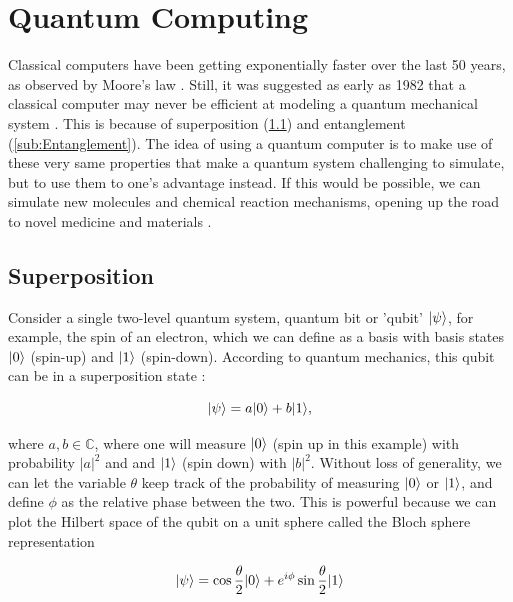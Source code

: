 \section{Quantum Computing}

Classical computers have been getting exponentially faster over the last 50 years, as observed by Moore's law \cite{Moore1965}. Still, it was suggested as early as 1982 that a classical computer may never be efficient at modeling a quantum mechanical system \cite{Feynman1982}. This is because of superposition (\cref{sub:Superposition}) and entanglement (\cref{sub:Entanglement}). The idea of using a quantum computer is to make use of these very same properties that make a quantum system challenging to simulate, but to use them to one's advantage instead. If this would be possible, we can simulate new molecules and chemical reaction mechanisms, opening up the road to novel medicine \cite{Robert2021} and materials \cite{Ma2020}. 

\subsection{Superposition}\label{sub:Superposition}

Consider a single two-level quantum system, quantum bit or 'qubit' $\lvert\psi\rangle$, for example, the spin of an electron, which we can define as a basis with basis states $\lvert0\rangle$ (spin-up) and $\lvert1\rangle$ (spin-down). According to quantum mechanics, this qubit can be in a superposition state \cite{Griffiths2004}:

\begin{equation}\label{eq:SuperPositionBasic}
	\lvert\psi\rangle=a\lvert0\rangle+b\lvert1\rangle,
\end{equation}

where $a,b \in \mathbb{C}$, where one will measure $\lvert0\rangle$ (spin up in this example) with probability $|a|^2$ and and $\lvert1\rangle$ (spin down) with $|b|^2$. Without loss of generality, we can let the variable $\theta$ keep track of the probability of measuring $\lvert0\rangle$ or $\lvert1\rangle$, and define $\phi$ as the relative phase between the two. This is powerful because we can plot the Hilbert space of the qubit on a unit sphere called the Bloch sphere representation \cite{Nielsen2011}

\begin{equation}\label{eq:BlochSphere}
	\lvert\psi\rangle = 
	\cos{\frac{\theta}{2}} \lvert0\rangle + e^{i \phi} \sin{\frac{\theta}{2}} \lvert1\rangle
\end{equation}

